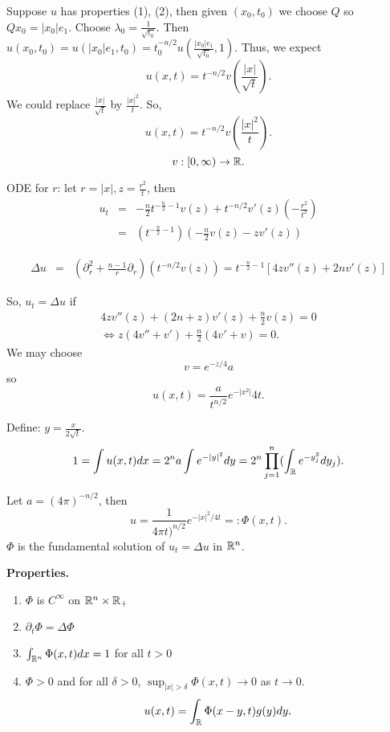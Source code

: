 \documentclass[11pt]{amsart}%
\begin{document}
 Suppose $u$ has properties (1), (2), then given $(x_0, t_0)$ we choose $Q$ so $Qx_0=\vert x_0\vert e_1$. Choose $\lambda_0 =\frac{1}{\sqrt{t_0}}$. Then $u(x_0, t_0) =u(\vert x_0\vert e_1, t_0)=t^{-n/2}_0 u(\frac{\vert x_0\vert e_1}{\sqrt{t_0}},1)$. Thus, we expect
 $$u(x,t)=t^{-n/2} v(\frac{\vert x\vert}{\sqrt{t}}).$$ We could replace $\frac{\vert x\vert}{\sqrt{t}}$ by $\frac{\vert x\vert^2}{{t}}$. So, $$u(x,t)=t^{-n/2} v(\frac{\vert x\vert^2}{t}).$$
 $$v:[0,\infty)\to \mathbb{R}.$$
 
 ODE for $r$: let $r=\vert x\vert, z=\frac{r^2}{t}$, then
 \begin{eqnarray*}
    u_t &=& -\frac{n}{2} t^{-\frac{n}{2} -1}v(z) + t^{-n/2}v'(z)(-\frac{r^2}{t^2})\\
        &=& (t^{-\frac{n}{2}-1})(-\frac{n}{2}v(z) - zv'(z))
 \end{eqnarray*}
 
 \begin{eqnarray*}
    \Delta u &=& (\partial_r^2 + \frac{n-1}{r}\partial_r)(t^{-n/2}v(z)) = t^{-\frac{n}{2}-1} [4zv''(z) + 2nv'(z)]
 \end{eqnarray*}
 
 So, $u_t =\Delta u$ if
 \begin{eqnarray*}
    4zv''(z) + (2n+z)v'(z) + \frac{n}{2} v(z) =0\\
    \iff z(4v''+v') + \frac{n}{2}(4v' + v) = 0.
 \end{eqnarray*}
 We may choose $$v=e^{-z/4} a$$ so $$u(x,t) = \frac{a}{t^{n/2}} e^{-\vert x^2\vert}{4t}.$$
 
 Define: $y=\frac{x}{2\sqrt{t}}$.
 $$1=\int u(x,t)dx = 2^n a\int e^{-\vert y\vert^2} dy = 2^n\prod_{j=1}^n(\int_{\mathbb{R}} e^{-y^2_j}dy_j).$$
 
 Let $a=(4\pi)^{-n/2}$, then
 $$u=\frac{1}{4\pi t)^{n/2}} e^{-\vert x\vert^2/4t} =: \Phi(x,t).$$
 $\Phi$ is the fundamental solution of $u_t=\Delta u$ in $\mathbb{R}^n$.
 
 {\bf Properties.}
 \begin{enumerate}
     \item $\Phi$ is $C^\infty$ on $\mathbb{R}^n\times \mathbb{R}_+$
     \item $\partial_t \Phi =\Delta \Phi$
     \item $\int_{\mathbb{R}^n} \Phi(x,t)dx =1$ for all $t>0$
     \item $\Phi>0$ and for all $\delta>0$, $\sup_{\vert x\vert >\delta} \Phi(x,t)\to 0$ as $t\to 0$.
     $$u(x,t)=\int_{\mathbb{R}} \Phi(x-y,t)g(y) dy.$$
 \end{enumerate}
 
\end{document}
